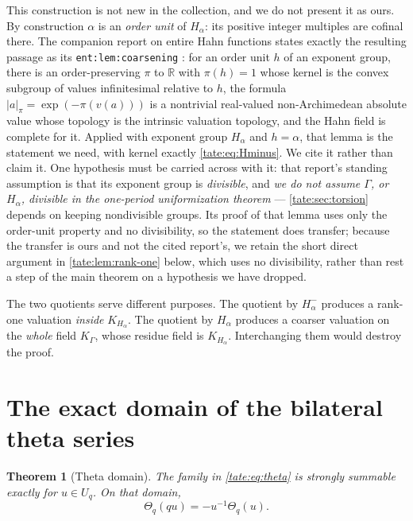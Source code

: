 \documentclass[11pt,letterpaper]{article}
\newtheorem{theorem}{Theorem}[section]
\theoremstyle{definition}
\newcommand{\R}{\mathbb R}
\begin{document}
This construction is not new in the collection, and we do not present it
as ours. By construction $\alpha$ is an \emph{order unit} of $H_\alpha$:
its positive integer multiples are cofinal there. The companion report on
entire Hahn functions states exactly the resulting passage as its
\texttt{ent:lem:coarsening} \cite{RepoEntire}: for an order unit $h$ of
an exponent group, there is an order-preserving $\pi$ to $\R$ with
$\pi(h)=1$ whose kernel is the convex subgroup of values infinitesimal
relative to $h$, the formula $|a|_\pi=\exp(-\pi(v(a)))$ is a nontrivial
real-valued non-Archimedean absolute value whose topology is the
intrinsic valuation topology, and the Hahn field is complete for it.
Applied with exponent group $H_\alpha$ and $h=\alpha$, that lemma is the
statement we need, with kernel exactly \eqref{tate:eq:Hminus}. We cite it
rather than claim it. One hypothesis must be carried across with it: that
report's standing assumption is that its exponent group is
\emph{divisible}, and \emph{we do not assume $\Gamma$, or $H_\alpha$,
divisible in the one-period uniformization theorem} --- \cref{tate:sec:torsion} depends on
keeping nondivisible groups. Its proof of that lemma uses only the
order-unit property and no divisibility, so the statement does transfer;
because the transfer is ours and not the cited report's, we retain the
short direct argument in \cref{tate:lem:rank-one} below, which uses no
divisibility, rather than rest a step of the main theorem on a hypothesis
we have dropped.

The two quotients serve different purposes. The quotient by
$H_\alpha^-$ produces a rank-one valuation \emph{inside} $K_{H_\alpha}$.
The quotient by $H_\alpha$ produces a coarser valuation on the \emph{whole}
field $K_\Gamma$, whose residue field is $K_{H_\alpha}$.
Interchanging them would destroy the proof.

\section{The exact domain of the bilateral theta series}\label{tate:sec:theta}

\begin{theorem}[Theta domain]\label{tate:thm:theta}
The family in \eqref{tate:eq:theta} is strongly summable exactly for
$u\in U_q$. On that domain,
\begin{equation}
 \Theta_q(qu)=-u^{-1}\Theta_q(u).\label{tate:eq:theta-functional}
\end{equation}
\end{theorem}
\end{document}
